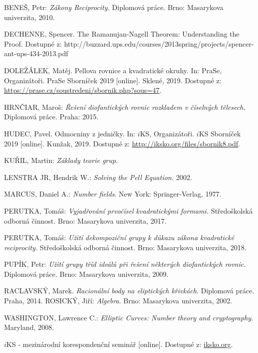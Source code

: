 \documentclass [12pt]{report}
\begin{document}
\begin{thebibliography}{97}
BENEŠ, Petr: \textit{Zákony Reciprocity.} Diplomová práce. Brno: Masarykova univerzita, 2010. 

DECHENNE, Spencer. The Ramanujan-Nagell Theorem: Understanding the Proof. Dostupné z: http://buzzard.ups.edu/courses/2013spring/projects/spencer-ant-ups-434-2013.pdf

DOLEŽÁLEK, Matěj. Pellova rovnice a kvadratické okruhy. In: PraSe, Organizátoři. PraSe Sborníček 2019 [online]. Sklené, 2019. Dostupné z: \url{https://prase.cz/soustredeni/sbornik.php?sous=47}. 


HRNČIAR, Maroš: \textit{Řešení diofantických rovnic rozkladem v číselných tělesech.} Diplomová práce. Praha: 2015. 

HUDEC, Pavel. Odmocniny z jedničky. In: $i$KS, Organizátoři. $i$KS Sborníček 2019 [online]. Kunžak, 2019. Dostupné z: \url{http://iksko.org/files/sbornik8.pdf}. 

KUŘIL, Martin: \textit{Základy teorie grup}.

LENSTRA JR, Hendrik W.: \textit{Solving the Pell Equation.} 2002. 

MARCUS, Daniel A.: \textit{Number fields}. New York: Springer-Verlag, 1977.

PERUTKA, Tomáš: \textit{Vyjadřování prvočísel kvadratickými formami.} Středoškolská odborná činnost. Brno: Masarykova univerzita, 2017. 

PERUTKA, Tomáš: \textit{Užití dekompoziční grupy k důkazu zákona kvadratické reciprocity.} Středoškolská odborná činnost. Brno: Masarykova univerzita, 2018. 

PUPÍK, Petr: \textit{Užití grupy tříd ideálů při řešení některých diofantických rovnic.} Diplomová práce. Brno: Masarykova univerzita, 2009.

RACLAVSKÝ, Marek. \textit{Racionální body na eliptických křivkách}. Diplomová práce. Praha, 2014.
ROSICKÝ, Jiří: \textit{Algebra}. Brno: Masarykova univerzita, 2002.

WASHINGTON, Lawrence C.: \textit{Elliptic Curves: Number theory and cryptography}. Maryland, 2008. 

$i$KS - mezinárodní korespondenční seminář [online]. Dostupné z: \url{iksko.org}.

\end{thebibliography}
\end{document}
